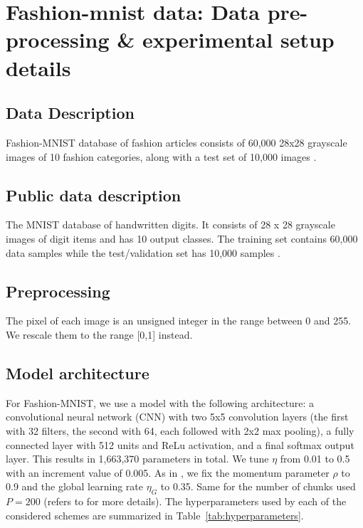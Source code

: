 \documentclass[accepted]{uai2021} %
\begin{document}
\section{Fashion-mnist data: Data pre-processing \& experimental setup details}
\subsection{Data Description}
\label{sec:fashion_mnist_desc}
Fashion-MNIST database of fashion articles consists of 60,000 28x28 grayscale images of 10 fashion categories, along with a test set of 10,000 images \cite{Fashion-MNIST} \cite{KERAS_datasets}.

\subsection{Public data description}
\label{sec:mnist_desc}
The MNIST database of handwritten digits. It consists of 28 x 28 grayscale images of digit items and has 10 output classes. The training set contains 60,000 data samples while the test/validation set has 10,000 samples \cite{MNIST} \cite{KERAS_datasets}.


\subsection{Preprocessing}
The pixel of each image is an unsigned integer in the range between 0 and 255. We rescale them to the range [0,1] instead. \medskip

\subsection{Model architecture}
For Fashion-MNIST, we use a model \cite{FedAVG,our_cs} with the following architecture: a convolutional neural network (CNN) with two 5x5 convolution layers (the first with 32 filters, the second with 64, each followed with 2x2 max pooling), a fully connected layer with 512 units and ReLu activation, and a final softmax output layer. This results in 1,663,370 parameters in total. We tune $\eta$ from 0.01 to 0.5 with an increment value of 0.005. As in \cite{our_cs}, we fix the momentum parameter $\rho$ to 0.9 and the global learning rate $\eta_{G}$ to 0.35. Same for the number of chunks used $P =200$ (refers to \cite{our_cs} for more details).  The hyperparameters used by each of the considered schemes are summarized in Table~\ref{tab:hyperparameters}.
\end{document}
